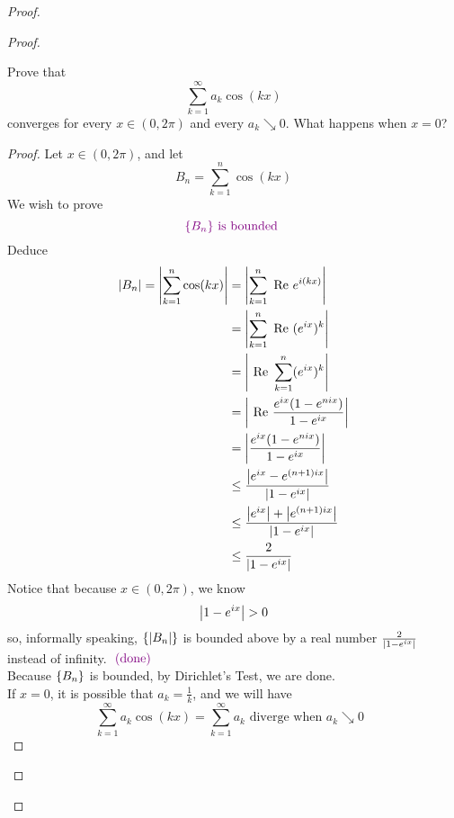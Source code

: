 \documentclass{report}
\begin{document}
\begin{proof}
\begin{proof}
\begin{question}{}{}
Prove that 
\[
\sum_{k=1}^{\infty} a_k \cos(kx)
\]
converges for every \( x \in (0, 2\pi) \) and every \( a_k \searrow 0 \). What happens when \( x = 0 \)?
\end{question}
\begin{proof}
Let $x\in (0,2\pi)$, and let 
\begin{equation}
B_n=\sum_{k=1}^n \cos(kx)
\end{equation}
We wish to prove
\begin{equation}
\textcolor{violet}{\{ B_n \}\text{ is bounded }}
\end{equation}
Deduce
\begin{align}
  \left|B_n\right|=\left|\sum_{k=1}^n \cos (kx)\right|&= \left|\sum_{k=1}^n \text{ Re }e^{i(kx)}\right|\\
  &=\left|\sum_{k=1}^n \text{ Re }(e^{ix})^k\right|\\
  &=\left|\text{ Re }\sum_{k=1}^n (e^{ix})^k\right|\\
  &=\left|\text{ Re }\frac{e^{ix}(1-e^{nix})}{1-e^{ix}}\right|\\
  &=\left|\frac{e^{ix}(1-e^{nix})}{1-e^{ix}}\right|\\
  &\leq \frac{\left|e^{ix}-e^{(n+1)ix}\right|}{\left|1-e^{ix}\right|}\\
  &\leq \frac{\left|e^{ix}\right|+\left|e^{(n+1)ix}\right|}{\left|1-e^{ix}\right|}\\
  &\leq \frac{2}{\left|1-e^{ix}\right|}
\end{align}
Notice that because $x\in (0,2\pi)$, we know 
\begin{equation}
\abso{1-e^{ix}}>0
\end{equation}
so, informally speaking, $\{ \left|B_n\right| \}$ is bounded above by a real number $\frac{2}{\left|1-e^{ix}\right|}$ instead of infinity. $\textcolor{violet}{\text{ (done) }}$\\

Because $\{ B_n \}$ is bounded, by Dirichlet's Test, we are done.\\

If $x=0$, it is possible that  $a_k=\frac{1}{k}$, and we will have
\begin{equation}
\sum_{k=1}^\infty a_k\cos(kx)=\sum_{k=1}^\infty a_k\text{ diverge when $a_k\searrow 0$ }
\end{equation}
\end{proof}


\end{proof}
\end{proof}
\end{document}

